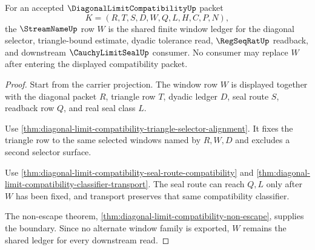 \begin{theorem}
\label{thm:diagonal-limit-compatibility-shared-window-ledger}
For an accepted $\DiagonalLimitCompatibilityUp$ packet
$$
K=(R,T,S,D,W,Q,L,H,C,P,N),
$$
the $\StreamNameUp$ row $W$ is the shared finite window ledger for the diagonal selector, triangle-bound estimate, dyadic tolerance read, $\RegSeqRatUp$ readback, and downstream $\CauchyLimitSealUp$ consumer. No consumer may replace $W$ after entering the displayed compatibility packet.
\end{theorem}
\begin{proof}
Start from the carrier projection. The window row $W$ is displayed together with the diagonal packet $R$, triangle row $T$, dyadic ledger $D$, seal route $S$, readback row $Q$, and real seal class $L$.

Use \autoref{thm:diagonal-limit-compatibility-triangle-selector-alignment}. It fixes the triangle row to the same selected windows named by $R,W,D$ and excludes a second selector surface.

Use \autoref{thm:diagonal-limit-compatibility-seal-route-compatibility} and \autoref{thm:diagonal-limit-compatibility-classifier-transport}. The seal route can reach $Q,L$ only after $W$ has been fixed, and transport preserves that same compatibility classifier.

The non-escape theorem, \autoref{thm:diagonal-limit-compatibility-non-escape}, supplies the boundary. Since no alternate window family is exported, $W$ remains the shared ledger for every downstream read.
\end{proof}

